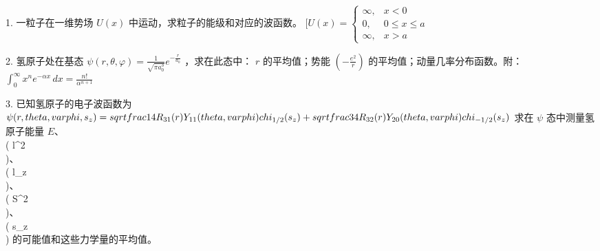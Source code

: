 1. 一粒子在一维势场 $U(x)$ 中运动，求粒子的能级和对应的波函数。
$[ U(x) = \begin{cases} \infty, & x < 0 \\0, & 0 \le x \le a \\\infty, & x > a \end{cases}$

2. 氢原子处在基态 $\psi (r, \theta, \varphi) = \frac{1}{\sqrt{\pi a_0^3}} e^{-\frac{r}{a_0}}$ ，求在此态中： $r$ 的平均值；势能 $( -\frac{e^2}{r} )$ 的平均值；动量几率分布函数。附： 
$\int_0^\infty x^n e^{-\alpha x} \, dx = \frac{n!}{\alpha^{n+1}}$

3. 已知氢原子的电子波函数为 
$\psi(r, \\theta, \\varphi, s_z) = \\sqrt{\\frac{1}{4}} R_{31}(r) Y_{11}(\\theta, \\varphi) \\chi_{1/2}(s_z) + \\sqrt{\\frac{3}{4}} R_{32}(r) Y_{20}(\\theta, \\varphi) \\chi_{-1/2}(s_z)$
求在 $\psi$ 态中测量氢原子能量 $E$、 \\( l^2 \\)、 \\( l_z \\)、 \\( S^2 \\)、 \\( s_z \\) 的可能值和这些力学量的平均值。

